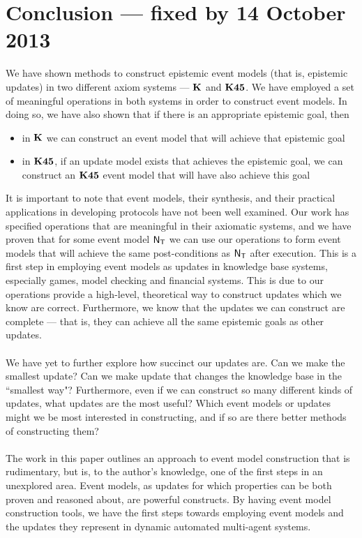 \section{Conclusion --- fixed by 14 October 2013}

We have shown methods to construct epistemic event models (that is, epistemic updates) in two different axiom systems --- $\bf K$
and $\bf K45$.
We have employed a set of meaningful operations in both systems in order to construct event models.
In doing so, we have also shown that if there is an appropriate epistemic goal, then
\begin{itemize}
	\item in $\bf K$ we can construct an event model that will achieve that epistemic goal
	\item in $\bf K45$, if an update model exists that achieves the epistemic goal, we can construct an
$\bf K45$ event model that will have also achieve this goal
\end{itemize}

It is important to note that event models, their synthesis, and their practical applications in
developing protocols have not been well examined.
Our work has specified operations that are meaningful in their axiomatic systems, and we have proven
that for some event model $\mathrm{\mathsf{N}}_\mathrm{\mathsf{T}}$ we can use our operations to form event models that will
achieve the same post-conditions as $\mathrm{\mathsf{N}}_\mathrm{\mathsf{T}}$ after execution.
This is a first step in employing event models as updates in knowledge base systems, especially
games, model checking and financial systems.
This is due to our operations provide a high-level, theoretical way to construct updates which we know are correct.
Furthermore, we know that the updates we can construct are complete --- that is, they can achieve
all the same epistemic goals as other updates.\\
\\
We have yet to further explore how succinct our updates are.
Can we make the smallest update?
Can we make update that changes the knowledge base in the ``smallest way"?
Furthermore, even if we can construct so many different kinds of updates, what updates are the most
useful?
Which event models or updates might we be most interested in constructing, and if so are there
better methods of constructing them?\\
\\
The work in this paper outlines an approach to event model construction that is rudimentary, but is,
to the author's knowledge, one of the first steps in an unexplored area.
Event models, as updates for which properties can be both proven and reasoned about, are powerful
constructs.
By having event model construction tools, we have the first steps towards employing event models and
the updates they represent in dynamic automated multi-agent systems.

